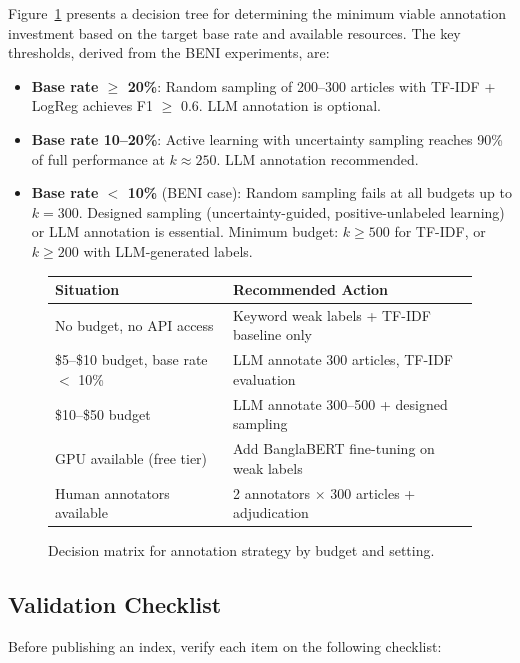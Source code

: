 Figure~\ref{fig:decision-tree} presents a decision tree for determining the minimum viable annotation investment based on the target base rate and available resources. The key thresholds, derived from the BENI experiments, are:

\begin{itemize}
    \item \textbf{Base rate $\geq$ 20\%}: Random sampling of 200--300 articles with TF-IDF + LogReg achieves F1 $\geq$ 0.6. LLM annotation is optional.
    \item \textbf{Base rate 10--20\%}: Active learning with uncertainty sampling reaches 90\% of full performance at $k \approx 250$. LLM annotation recommended.
    \item \textbf{Base rate $<$ 10\%} (BENI case): Random sampling fails at all budgets up to $k = 300$. Designed sampling (uncertainty-guided, positive-unlabeled learning) or LLM annotation is essential. Minimum budget: $k \geq 500$ for TF-IDF, or $k \geq 200$ with LLM-generated labels.
\end{itemize}

\begin{figure}[h]
\centering
\begin{tabular}{ll}
\toprule
Situation & Recommended Action \\
\midrule
No budget, no API access & Keyword weak labels + TF-IDF baseline only \\
\$5--\$10 budget, base rate $<$ 10\% & LLM annotate 300 articles, TF-IDF evaluation \\
\$10--\$50 budget & LLM annotate 300--500 + designed sampling \\
GPU available (free tier) & Add BanglaBERT fine-tuning on weak labels \\
Human annotators available & 2 annotators $\times$ 300 articles + adjudication \\
\bottomrule
\end{tabular}
\caption{Decision matrix for annotation strategy by budget and setting.}
\label{fig:decision-tree}
\end{figure}

\subsection{Validation Checklist}

Before publishing an index, verify each item on the following checklist:

